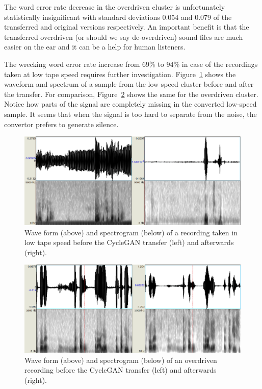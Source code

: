 \documentclass[conference]{IEEEtran}
\begin{document}
The word error rate decrease in the overdriven cluster is unfortunately statistically
insignificant with standard deviations 0.054 and 0.079 of the transferred and
original versions respectively. An important benefit is
that the transferred overdriven (or should we say de-overdriven) sound files are
much easier on the ear and it can be a help for human listeners.

The wrecking word error rate increase from 69\% to 94\% in case of the
recordings taken at low tape speed requires further investigation.
Figure~\ref{fig:plzen} shows the waveform and spectrum of a sample from the low-speed
cluster before and after the transfer. For comparison,
Figure~\ref{fig:overdrive} shows the same for the overdriven cluster.
Notice how parts of the signal are completely missing in the converted low-speed
sample. It seems that when the signal is too hard to separate from the noise,
the convertor prefers to generate silence.

\begin{figure}[tpb]
\centering
\includegraphics[width=0.9\hsize]{rc/plzen.eps}
\caption{Wave form (above) and spectrogram (below) of a recording taken in low
tape speed before the CycleGAN transfer (left) and afterwards (right).}
\label{fig:plzen}
\end{figure}

\begin{figure}[tpb]
\centering
\includegraphics[width=0.9\hsize]{rc/overdrive.eps}
\caption{Wave form (above) and spectrogram (below) of an overdriven recording
before the CycleGAN transfer (left) and afterwards (right).}
\label{fig:overdrive}
\end{figure}
\end{document}
